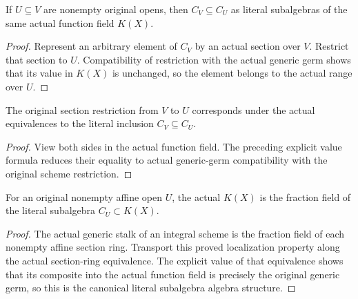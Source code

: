 \begin{theorem}\label{thm:sc0-scheme-sections-function-field-containment}
\leanok
{}
If $U\subseteq V$ are nonempty original opens, then $C_V\subseteq C_U$
as literal subalgebras of the same actual function field $K(X)$.
\end{theorem}
\begin{proof}
Represent an arbitrary element of $C_V$ by an actual section over
$V$. Restrict that section to $U$. Compatibility of restriction with
the actual generic germ shows that its value in $K(X)$ is unchanged,
so the element belongs to the actual range over $U$.
\end{proof}

\begin{theorem}\label{thm:sc0-scheme-sections-function-field-restriction}
\leanok
{}
The original section restriction from $V$ to $U$ corresponds under
the actual equivalences to the literal inclusion $C_V\subseteq C_U$.
\end{theorem}
\begin{proof}
View both sides in the actual function field. The preceding explicit
value formula reduces their equality to actual generic-germ
compatibility with the original scheme restriction.
\end{proof}

\begin{theorem}\label{thm:sc0-scheme-sections-function-field-fraction}
\leanok
{}
For an original nonempty affine open $U$, the actual $K(X)$ is the
fraction field of the literal subalgebra $C_U\subset K(X)$.
\end{theorem}
\begin{proof}
The actual generic stalk of an integral scheme is the fraction field
of each nonempty affine section ring. Transport this proved
localization property along the actual section-ring equivalence.
The explicit value of that equivalence shows that its composite into
the actual function field is precisely the original generic germ,
so this is the canonical literal subalgebra algebra structure.
\end{proof}


